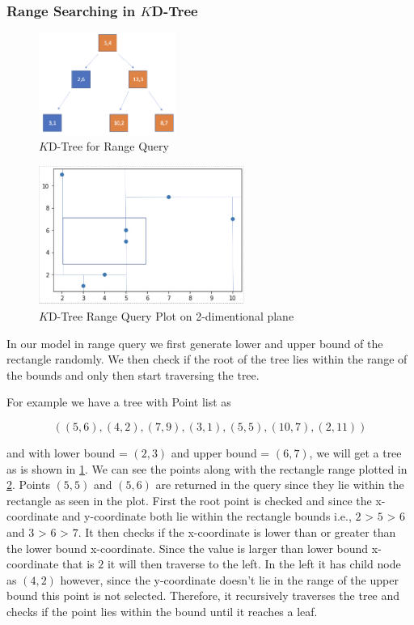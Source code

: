 \subsubsection{Range Searching in $K$D-Tree}

\begin{figure}[htp]
    \centering
    \includegraphics[width=0.4\textwidth]{graphs/Range_Query_Tree.png}
    \caption{$K$D-Tree for Range Query}
    \label{fig:KD-Tree_for_Range Query}
\end{figure}

\begin{figure}[htp]
    \centering
    \includegraphics[width=0.6\textwidth]{graphs/Range_Query_plot.png}
    \caption{$K$D-Tree Range Query Plot on 2-dimentional plane}
    \label{fig:KD_Tree_Range_Query_Plot}
\end{figure}

In our model in range query we first generate lower and upper bound of the rectangle randomly. We then check if the root of the tree lies within the range of the bounds and only then start traversing the tree. 
\begin{mscexample}
    For example we have a tree with Point list as 

	$$((5,6),(4,2),(7,9),(3,1),(5,5),(10,7),(2,11))$$
	
	and with lower bound = $(2,3)$ and upper bound = $(6,7)$, we will get a tree as is shown in \ref{fig:KD-Tree_for_Range Query}. We can see the points along with the rectangle range plotted in \ref{fig:KD_Tree_Range_Query_Plot}. Points $(5,5)$ and $(5,6)$ are returned in the query since they lie within the rectangle as seen in the plot. First the root point is checked and since the x-coordinate and y-coordinate both lie within the rectangle bounds i.e., $2$ > $5$ > $6$ and $3$ > $6$ > $7$. It then checks if the x-coordinate is lower than or greater than the lower bound x-coordinate. Since the value is larger than lower bound x-coordinate that is $2$ it will then traverse to the left. In the left it has child node as $(4,2)$ however, since the y-coordinate doesn't lie in the range of the upper bound this point is not selected. Therefore, it recursively traverses the tree and checks if the point lies within the bound until it reaches a leaf.
\end{mscexample}
